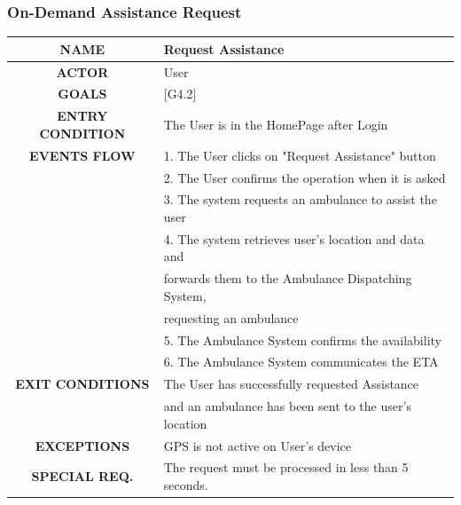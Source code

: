 \documentclass[12pt,a4paper]{article}
\begin{document}
		\subsubsection{On-Demand Assistance Request}
		\begin{center}
			\begin{tabular}{| c | l |}
				\hline
				\textbf{NAME} & Request Assistance \\
				\hline
				\textbf{ACTOR} & User \\
				\hline
				\textbf{GOALS} & [G4.2] \\
				\hline
				\textbf{ENTRY CONDITION} & The User is in the HomePage after Login\\ \hline
				\textbf{EVENTS FLOW}  &
				1. The User clicks on "Request Assistance" button\\
				&2. The User confirms the operation when it is asked\\
				&3. The system requests an ambulance to assist the user\\
				&4. The system retrieves user's location and data and\\
				&forwards them to the Ambulance Dispatching System,\\
				& requesting an ambulance \\
				&5. The Ambulance System confirms the availability\\
				&6. The Ambulance System communicates the ETA\\
				\hline
				\textbf{EXIT CONDITIONS}  & The User has successfully requested Assistance\\
				& and an ambulance has been sent to the user's location\\ \hline
				\textbf{EXCEPTIONS} &
				GPS is not active on User's device\\ \hline
				\textbf{SPECIAL REQ.} &
				The request must be processed in less than 5 seconds.\\
				\hline
			\end{tabular}
		\end{center}
	
\end{document}
